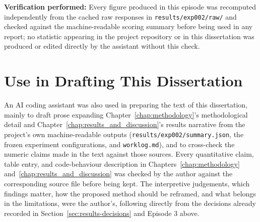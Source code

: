 \textbf{Verification performed:} Every figure produced in this episode was recomputed independently from the cached raw responses in \texttt{results/exp002/raw/} and checked against the machine-readable scoring summary before being used in any report; no statistic appearing in the project repository or in this dissertation was produced or edited directly by the assistant without this check.

\section{Use in Drafting This Dissertation}
An AI coding assistant was also used in preparing the text of this dissertation, mainly to draft prose expanding Chapter~\ref{chap:methodology}'s methodological detail and Chapter~\ref{chap:results_and_discussion}'s results narrative from the project's own machine-readable outputs (\texttt{results/exp002/summary.json}, the frozen experiment configurations, and \texttt{worklog.md}), and to cross-check the numeric claims made in the text against those sources. Every quantitative claim, table entry, and code-behaviour description in Chapters~\ref{chap:methodology} and~\ref{chap:results_and_discussion} was checked by the author against the corresponding source file before being kept. The interpretive judgements, which findings matter, how the proposed method should be reframed, and what belongs in the limitations, were the author's, following directly from the decisions already recorded in Section~\ref{sec:results-decisions} and Episode 3 above.

